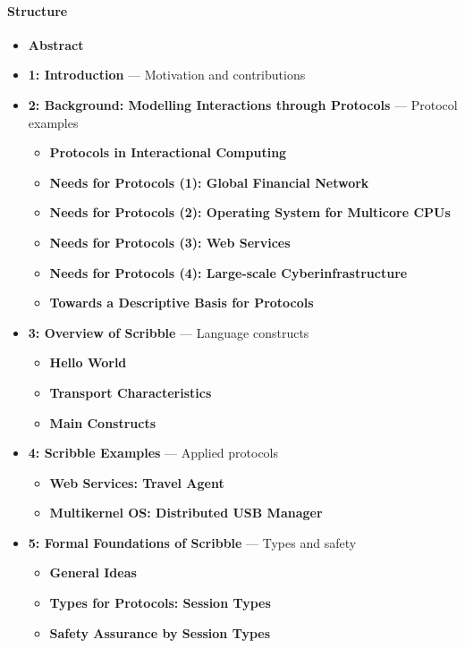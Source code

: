 \documentclass{article}
\begin{document}
\paragraph{Structure}
\begin{itemize}
    \item \textbf{Abstract}

    \item \textbf{1: Introduction} --- Motivation and contributions

    \item \textbf{2: Background: Modelling Interactions through Protocols} --- Protocol examples
    \begin{itemize}
        \item \textbf{Protocols in Interactional Computing}
        \item \textbf{Needs for Protocols (1): Global Financial Network}
        \item \textbf{Needs for Protocols (2): Operating System for Multicore CPUs}
        \item \textbf{Needs for Protocols (3): Web Services}
        \item \textbf{Needs for Protocols (4): Large-scale Cyberinfrastructure}
        \item \textbf{Towards a Descriptive Basis for Protocols}
    \end{itemize}

    \item \textbf{3: Overview of Scribble} --- Language constructs
    \begin{itemize}
        \item \textbf{Hello World}
        \item \textbf{Transport Characteristics}
        \item \textbf{Main Constructs}
    \end{itemize}

    \item \textbf{4: Scribble Examples} --- Applied protocols
    \begin{itemize}
        \item \textbf{Web Services: Travel Agent}
        \item \textbf{Multikernel OS: Distributed USB Manager}
    \end{itemize}

    \item \textbf{5: Formal Foundations of Scribble} --- Types and safety
    \begin{itemize}
        \item \textbf{General Ideas}
        \item \textbf{Types for Protocols: Session Types}
        \item \textbf{Safety Assurance by Session Types}
    \end{itemize}


\end{itemize}
\end{document}
